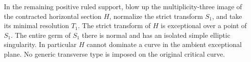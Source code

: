 
\begin{proposition}[P4.53]\hypertarget{tag-02XS}{}\label{night:P4.53}\label{stmt:P4.53}


In the remaining positive ruled support, blow up the
multiplicity-three image of the contracted horizontal
section $H$, normalize the strict transform $S_1$, and
take its minimal resolution $T_1$. The strict transform
of $H$ is exceptional over a point of $S_1$. The entire
germ of $S_1$ there is normal and has an isolated simple
elliptic singularity. In particular $H$ cannot dominate
a curve in the ambient exceptional plane. No generic
transverse type is imposed on the original critical curve.
\end{proposition}

